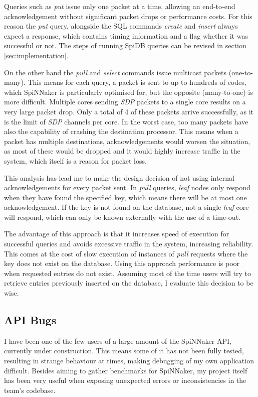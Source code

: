 Queries such as \textit{put} issue only one packet at a time, allowing an end-to-end acknowledgement without significant packet drops or performance costs. For this reason the \textit{put} query, alongside the SQL commands \textit{create} and \textit{insert} always expect a response, which contains timing information and a flag whether it was successful or not. The steps of running SpiDB queries can be revised in section \ref{sec:implementation}.

On the other hand the \textit{pull} and \textit{select} commands issue multicast packets (one-to-many). This means for each query, a packet is sent to up to hundreds of codes, which SpiNNaker is particularly optimised for, but the opposite (many-to-one) is more difficult. Multiple cores sending \textit{SDP} packets to a single core results on a very large packet drop. Only a total of 4 of these packets arrive successfully, as it is the limit of \textit{SDP} channels per core. In the worst case, too many packets have also the capability of crashing the destination processor.
This means when a packet has multiple destinations, acknowledgements would worsen the situation, as most of these would be dropped and it would highly increase traffic in the system, which itself is a reason for packet loss.

This analysis has lead me to make the design decision of not using internal acknowledgements for every packet sent. In \textit{pull} queries, \textit{leaf} nodes only respond when they have found the specified key, which means there will be at most one acknowledgement. If the key is not found on the database, not a single \textit{leaf} core will respond, which can only be known externally with the use of a time-out.

The advantage of this approach is that it increases speed of execution for successful queries and avoids excessive traffic in the system, increasing reliability. This comes at the cost of slow execution of instances of \textit{pull} requests where the key does not exist on the database. Using this approach performance is poor when requested entries do not exist. Assuming most of the time users will try to retrieve entries previously inserted on the database, I evaluate this decision to be wise.

\subsection{API Bugs}
I have been one of the few users of a large amount of the SpiNNaker API, currently under construction. This means some of it has not been fully tested, resulting in strange behaviour at times, making debugging of my own application difficult. Besides aiming to gather benchmarks for SpiNNaker, my project itself has been very useful when exposing unexpected errors or inconsistencies in the team's codebase.

